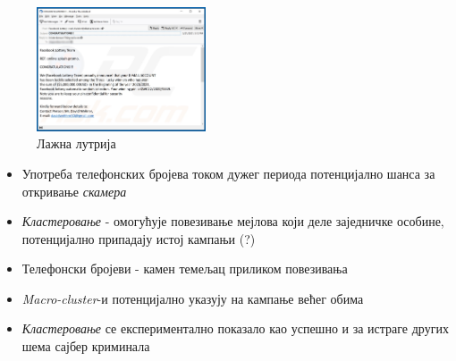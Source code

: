 \documentclass[compress, containsverbatim,mathserif, xcolor=dvipsnames, unicode]{beamer}
\begin{document}
\begin{frame}

\begin{figure}[h!]
    \centering
    \begin{center}
    \includegraphics[width=50mm]{slike/fake.jpg}
    \caption{Лажна лутрија}
    \end{center}
\end{figure}

\begin{itemize}
	\item Употреба телефонских бројева током дужег периода потенцијално шанса за откривање \emph{скамера} 
	\item \emph{Кластеровање} - омогућује повезивање мејлова који деле заједничке особине, потенцијално припадају истој кампањи (?)
	\item Телефонски бројеви - камен темељац приликом повезивања 
	\item \emph{Macro-cluster}-и потенцијално указују на кампање већег обима
	\item \emph{Кластеровање} се експериментално показало као успешно и за истраге других шема сајбер криминала 	
\end{itemize}
	
\end{frame}
\end{document}
